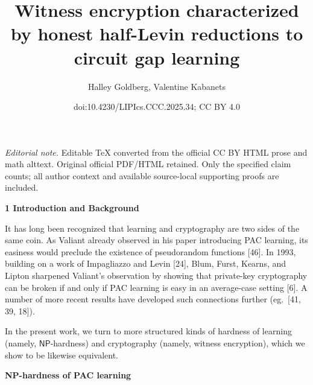 \documentclass[10pt,a4paper]{article}
\title{Witness encryption characterized by honest half-Levin reductions to circuit gap learning}
\author{Halley Goldberg, Valentine Kabanets}
\date{doi:10.4230/LIPIcs.CCC.2025.34; CC BY 4.0}
\begin{document}
\maketitle
\noindent\textit{Editorial note.} Editable TeX converted from the official CC BY HTML prose and math alttext. Original official PDF/HTML retained. Only the specified claim counts; all author context and available source-local supporting proofs are included.\par\medskip


\par\medskip\noindent\textbf{
1 Introduction and Background}\par




It has long been recognized that learning and cryptography are two sides of the same coin. As Valiant already observed in his paper introducing PAC learning, its easiness would preclude the existence of pseudorandom functions [46]. In 1993, building on a work of Impagliazzo and Levin [24], Blum, Furst, Kearns, and Lipton sharpened Valiant’s observation by showing that private-key cryptography can be broken if and only if PAC learning is easy in an average-case setting [6]. A number of more recent results have developed such connections further (eg. [41, 39, 18]).\par




In the present work, we turn to more structured kinds of hardness of learning (namely, ${\mathsf{NP}}$-hardness) and cryptography (namely, witness encryption), which we show to be likewise equivalent.\par




\par\medskip\noindent\textbf{NP-hardness of PAC learning}\par
\end{document}
